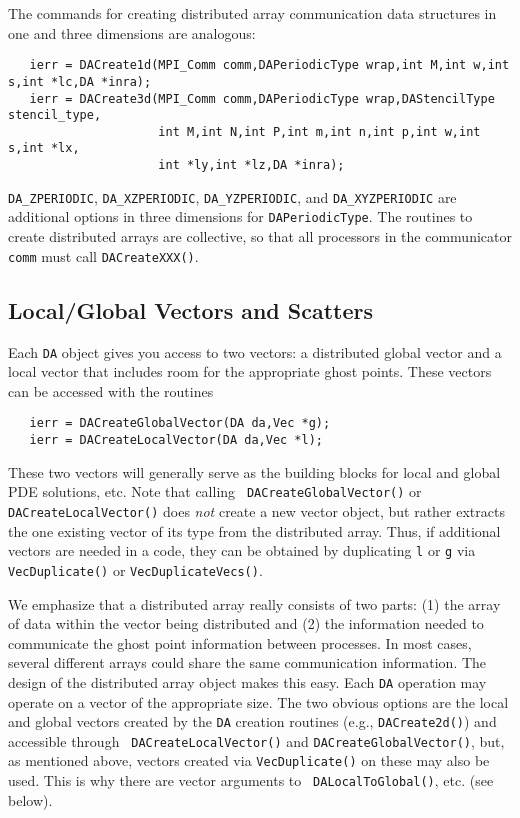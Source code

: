 The commands for creating distributed array communication data structures
in one and three dimensions are analogous:
  
\begin{verbatim}
   ierr = DACreate1d(MPI_Comm comm,DAPeriodicType wrap,int M,int w,int s,int *lc,DA *inra);
   ierr = DACreate3d(MPI_Comm comm,DAPeriodicType wrap,DAStencilType stencil_type,
                     int M,int N,int P,int m,int n,int p,int w,int s,int *lx,
                     int *ly,int *lz,DA *inra);
\end{verbatim}
{\tt DA\_ZPERIODIC}, 
{\tt DA\_XZPERIODIC}, 
{\tt DA\_YZPERIODIC}, and 
{\tt DA\_XYZPERIODIC} 
are additional options in three dimensions for {\tt DAPeriodicType}.
The routines to create distributed arrays are collective, so that all
processors in the communicator {\tt comm} must call {\tt DACreateXXX()}.

\subsection{Local/Global Vectors and Scatters}

Each {\tt DA} object gives you access to two vectors: a distributed global vector
and a local vector that includes room for the appropriate ghost points. These
vectors can be accessed 
with the routines 
\begin{verbatim}
   ierr = DACreateGlobalVector(DA da,Vec *g);
   ierr = DACreateLocalVector(DA da,Vec *l);
\end{verbatim}
These two vectors will generally serve as the building blocks for
local and global PDE solutions, etc.  Note that calling {\tt
DACreateGlobalVector()} or {\tt DACreateLocalVector()} does {\em not}
create a new vector object, but rather extracts the one existing
vector of its type from the distributed array.  Thus, if additional
vectors are needed in a code, they can be obtained by duplicating {\tt l}
or {\tt g} via {\tt VecDuplicate()} or {\tt VecDuplicateVecs()}.

We emphasize that a distributed array really consists of two parts:
(1) the array of data within the vector being distributed and (2) the
information needed to communicate the ghost point information between
processes.  In most cases, several different arrays could share the
same communication information.  The design of the distributed array
object makes this easy.  Each {\tt DA} operation may
operate on a vector of the appropriate size.  The two obvious options
are the local and global vectors created by the {\tt DA} creation
routines (e.g., {\tt DACreate2d()}) and accessible through {\tt
DACreateLocalVector()} and {\tt DACreateGlobalVector()}, but, as
mentioned above, vectors created via {\tt VecDuplicate()} on these may
also be used.  This is why there are vector arguments to {\tt
DALocalToGlobal()}, etc. (see below).

